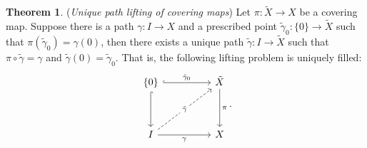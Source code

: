 \documentclass[letterpaper,11pt,twoside]{article}
\theoremstyle{definition}
\theoremstyle{definition}
\newtheorem{theorem}[proposition]{Theorem}
\theoremstyle{definition}
\theoremstyle{definition}
\theoremstyle{definition}
\theoremstyle{definition}
\theoremstyle{remark}
\theoremstyle{definition}
\begin{document}
\begin{theorem}\label{T-5.1.2} (\textit{Unique path lifting of covering maps})
Let $\pi : \tilde{X} \to X$ be a covering map. Suppose there is a path $\gamma : I \to X$ and a prescribed point $\tilde{\gamma}_0 : \{0\} \to \tilde{X}$ such that $\pi(\tilde{\gamma}_0)= \gamma(0)$, then there exists a unique path $\tilde{\gamma} : I \to \tilde{X}$ such that $\pi \circ \tilde{\gamma} = \gamma$ and $\tilde{\gamma} (0) = \tilde{\gamma}_0$. That is, the following lifting problem is uniquely filled:
\[\begin{tikzcd}
	{\{0\}} && {\tilde{X}} \\
	\\
	I && X
	\arrow["\pi", from=1-3, to=3-3]
	\arrow["\gamma"', from=3-1, to=3-3]
	\arrow[hook, from=1-1, to=3-1]
	\arrow["{\tilde{\gamma}_0}", hook, from=1-1, to=1-3]
	\arrow["\tilde\gamma"{description}, dashed, from=3-1, to=1-3]
\end{tikzcd}.\]
\end{theorem}
\end{document}
